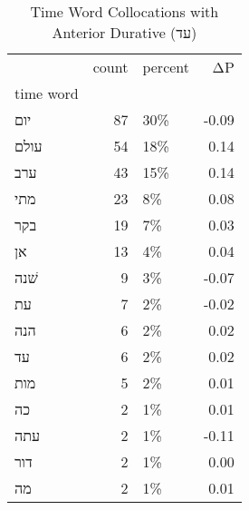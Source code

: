 \begin{table}[htbp!]
\centering
\caption{Time Word Collocations with Anterior Durative (עד)}
\label{table:antdurעד_head_cpd}
\begin{tabular}{lrlr}
\toprule
{} &  count & percent &    ΔP \\
time word &        &         &       \\
\midrule
יום       &     87 &     30\% & -0.09 \\
עולם      &     54 &     18\% &  0.14 \\
ערב       &     43 &     15\% &  0.14 \\
מתי       &     23 &      8\% &  0.08 \\
בקר       &     19 &      7\% &  0.03 \\
אן        &     13 &      4\% &  0.04 \\
שׁנה      &      9 &      3\% & -0.07 \\
עת        &      7 &      2\% & -0.02 \\
הנה       &      6 &      2\% &  0.02 \\
עד        &      6 &      2\% &  0.02 \\
מות       &      5 &      2\% &  0.01 \\
כה        &      2 &      1\% &  0.01 \\
עתה       &      2 &      1\% & -0.11 \\
דור       &      2 &      1\% &  0.00 \\
מה        &      2 &      1\% &  0.01 \\
\bottomrule
\end{tabular}
\end{table}
